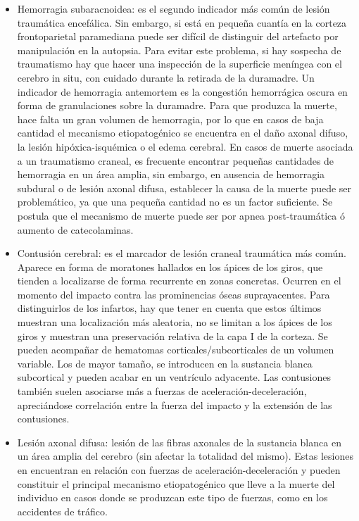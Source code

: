 \begin{itemize}
	\item Hemorragia subaracnoidea: es el segundo indicador más común de lesión traumática encefálica. Sin embargo, si está en pequeña cuantía en la corteza frontoparietal paramediana puede ser difícil de distinguir del artefacto por manipulación en la autopsia. Para evitar este problema, si hay sospecha de traumatismo hay que hacer una inspección de la superficie meníngea con el cerebro in situ, con cuidado durante la retirada de la duramadre. Un indicador de hemorragia antemortem es la congestión hemorrágica oscura en forma de granulaciones sobre la duramadre. Para que produzca la muerte, hace falta un gran volumen de hemorragia, por lo que en casos de baja cantidad el mecanismo etiopatogénico se encuentra en el daño axonal difuso, la lesión hipóxica-isquémica o el edema cerebral. En casos de muerte asociada a un traumatismo craneal, es frecuente encontrar pequeñas cantidades de hemorragia en un área amplia, sin embargo, en ausencia de hemorragia subdural o de lesión axonal difusa, establecer la causa de la muerte puede ser problemático, ya que una pequeña cantidad no es un factor suficiente. Se postula que el mecanismo de muerte puede ser por apnea post-traumática ó aumento de catecolaminas. 
	\item Contusión cerebral: es el marcador de lesión craneal traumática más común. Aparece en forma de moratones hallados en los ápices de los giros, que tienden a localizarse de forma recurrente en zonas concretas. Ocurren en el momento del impacto contra las prominencias óseas suprayacentes. Para distinguirlos de los infartos, hay que tener en cuenta que estos últimos muestran una localización más aleatoria, no se limitan a los ápices de los giros y muestran una preservación relativa de la capa I de la corteza. Se pueden acompañar de hematomas corticales/subcorticales de un volumen variable. Los de mayor tamaño, se introducen en la sustancia blanca subcortical y pueden acabar en un ventrículo adyacente. Las contusiones también suelen asociarse más a fuerzas de aceleración-deceleración, apreciándose correlación entre la fuerza del impacto y la extensión de las contusiones. 
	\item Lesión axonal difusa: lesión de las fibras axonales de la sustancia blanca en un área amplia del cerebro (sin afectar la totalidad del mismo). Estas lesiones en encuentran en relación con fuerzas de aceleración-deceleración y pueden constituir el principal mecanismo etiopatogénico que lleve a la muerte del individuo en casos donde se produzcan este tipo de fuerzas, como en los accidentes de tráfico. 
\end{itemize}
